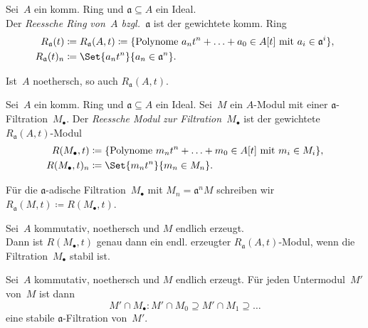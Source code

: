 \documentclass{cheat-sheet}
\newcommand{\aaa}{\mathfrak{a}}
\begin{document}

\begin{defn}
  Sei~$A$ ein komm. Ring und $\aaa \subseteq A$ ein Ideal. \\
  Der \emph{Reessche Ring} \textit{von~$A$ bzgl.~$\aaa$} ist der gewichtete komm. Ring
  \begin{align*}
    R_\aaa(t) & \coloneqq R_\aaa(A, t) \coloneqq \{ \text{Polynome } a_n t^n + \ldots + a_0 \in A[t] \text{ mit } a_i \in \aaa^i \}, \\
    R_\aaa(t)_n & \coloneqq \Set{a_n t^n}{a_n \in \aaa^n}.
  \end{align*}
\end{defn}

\begin{prop}
  Ist~$A$ noethersch, so auch $R_\aaa(A, t)$.
\end{prop}

\begin{defn}
  Sei~$A$ ein komm. Ring und $\aaa \subseteq A$ ein Ideal.
  Sei~$M$ ein $A$-Modul mit einer $\aaa$-Filtration~$M_\bullet$.
  Der \emph{Reessche Modul} \textit{zur Filtration~$M_\bullet$} ist der gewichtete $R_\aaa(A, t)$-Modul
  \begin{align*}
    R(M_\bullet, t) & \coloneqq \{ \text{Polynome } m_n t^n + \ldots + m_0 \in A[t] \text{ mit } m_i \in M_i \}, \\
    R(M_\bullet, t)_n & \coloneqq \Set{m_n t^n}{m_n \in M_n}.
  \end{align*}
\end{defn}

\begin{nota}
  Für die $\aaa$-adische Filtration~$M_\bullet$ mit $M_n = \aaa^n M$ schreiben wir
  $
    R_\aaa(M, t) \coloneqq R(M_\bullet, t)
  $.
\end{nota}

\begin{prop}
  Sei~$A$ kommutativ, noethersch und $M$ endlich erzeugt. \\
  Dann ist $R(M_\bullet, t)$ genau dann ein endl. erzeugter $R_\aaa(A, t)$-Modul, wenn die Filtration~$M_\bullet$ stabil ist.
\end{prop}


\begin{lem}
  Sei~$A$ kommutativ, noethersch und $M$ endlich erzeugt.
  Für jeden Untermodul~$M'$ von~$M$ ist dann
  \[
    M' \cap M_\bullet : M' \cap M_0 \supseteq M' \cap M_1 \supseteq \ldots
  \]
   eine stabile $\aaa$-Filtration von~$M'$.
\end{lem}
\end{document}
